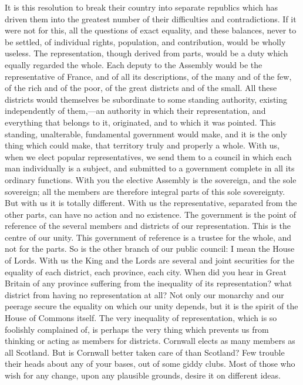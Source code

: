 It is this resolution to break their country into separate republics which has driven them into the greatest number of their difficulties and contradictions. If it were not for this, all the questions of exact equality, and these balances, never to be settled, of individual rights, population, and contribution, would be wholly useless. The representation, though derived from parts, would be a duty which equally regarded the whole. Each deputy to the Assembly would be the representative of France, and of all its descriptions, of the many and of the few, of the rich and of the poor, of the great districts and of the small. All these districts would themselves be subordinate to some standing authority, existing independently of them,—an authority in which their representation, and everything that belongs to it, originated, and to which it was pointed. This standing, unalterable, fundamental government would make, and it is the only thing which could make, that territory truly and properly a whole. With us, when we elect popular representatives, we send them to a council in which each man individually is a subject, and submitted to a government complete in all its ordinary functions. With you the elective Assembly is the sovereign, and the sole sovereign; all the members are therefore integral parts of this sole sovereignty. But with us it is totally different. With us the representative, separated from the other parts, can have no action and no existence. The government is the point of reference of the several members and districts of our representation. This is the centre of our unity. This government of reference is a trustee for the whole, and not for the parts. So is the other branch of our public council: I mean the House of Lords. With us the King and the Lords are several and joint securities for the equality of each district, each province, each city. When did you hear in Great Britain of any province suffering from the inequality of its representation? what district from having no representation at all? Not only our monarchy and our peerage secure the equality on which our unity depends, but it is the spirit of the House of Commons itself. The very inequality of representation, which is so foolishly complained of, is perhaps the very thing which prevents us from thinking or acting as members for districts. Cornwall elects as many members as all Scotland. But is Cornwall better taken care of than Scotland? Few trouble their heads about any of your bases, out of some giddy clubs. Most of those who wish for any change, upon any plausible grounds, desire it on different ideas.

